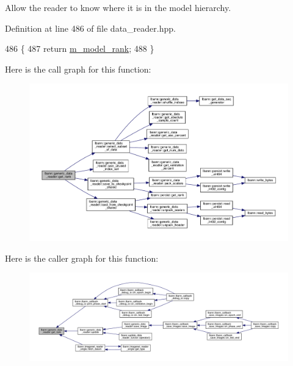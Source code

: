Allow the reader to know where it is in the model hierarchy. 



Definition at line 486 of file data\+\_\+reader.\+hpp.


\begin{DoxyCode}
486                        \{
487     \textcolor{keywordflow}{return} \hyperlink{classlbann_1_1generic__data__reader_a5e89d5e6797f7e7b69d1a64f7d8b5d6b}{m\_model\_rank};
488   \}
\end{DoxyCode}
Here is the call graph for this function\+:\nopagebreak
\begin{figure}[H]
\begin{center}
\leavevmode
\includegraphics[width=350pt]{classlbann_1_1generic__data__reader_ab5321bd7c6e83845785753366e6d9e64_cgraph}
\end{center}
\end{figure}
Here is the caller graph for this function\+:\nopagebreak
\begin{figure}[H]
\begin{center}
\leavevmode
\includegraphics[width=350pt]{classlbann_1_1generic__data__reader_ab5321bd7c6e83845785753366e6d9e64_icgraph}
\end{center}
\end{figure}
\mbox{\label{classlbann_1_1generic__data__reader_a4df1c749c3b20e786a5f1452daa7b540}} 
